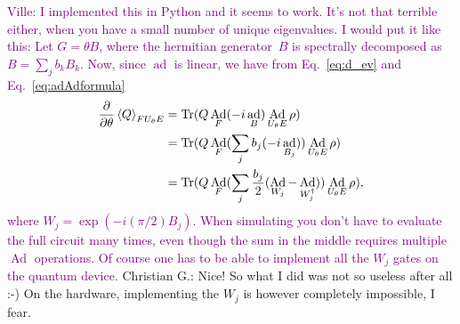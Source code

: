 \documentclass[aps,pra,10pt,twocolumn,groupedaddress,nofootinbib]{revtex4-1}
\theoremstyle{plain}
\DeclareMathOperator{\tr}{Tr}
\DeclareMathOperator{\Ad}{Ad}
\DeclareMathOperator{\ad}{ad}
\newcommand{\pd}[2]{\frac{\partial #1}{\partial #2}}  %
\newcommand{\expect}[1]{\ensuremath{\left\langle #1 \right\rangle}} %
\newcommand{\ville}[1]{\textcolor{purple}{Ville: #1}}
\newcommand{\cg}[1]{\textcolor{cyan!80!black}{Christian G.: #1}}
\begin{document}
\ville{I implemented this in Python and it seems to work. It's not that terrible either, when you have a small number of unique eigenvalues.
I would put it like this:
Let $G = \theta B$, where the hermitian generator~$B$ is spectrally decomposed as~$B = \sum_j b_k B_k$. Now, since $\ad$ is linear, we have
from Eq.~\eqref{eq:d_ev} and Eq.~\eqref{eq:adAdformula}
\begin{align}
  \pd{}{\theta} \expect{Q}_{F U_{\theta} E}
  &= \tr(Q \Ad_F (-i \ad_{B}) \Ad_{U_{\theta} E} \rho)\\
  \notag
  &= \tr(Q \Ad_F (\sum_j b_j (-i \ad_{B_j})) \Ad_{U_{\theta} E} \rho)\\
  \notag
  &= \tr(Q \Ad_F (\sum_j \frac{b_j}{2} (\Ad_{W_j} -\Ad_{W_j^\dagger})) \Ad_{U_{\theta} E} \rho),
\end{align}
where $W_j = \exp(-i (\pi/2) B_j)$.
When simulating you don't have to evaluate the full circuit many times, even though the sum in the middle requires multiple $\Ad$ operations.
Of course one has to be able to implement all the $W_j$ gates on the quantum device.
}
\cg{Nice! So what I did was not so useless after all :-) On the hardware, implementing the $W_j$ is however completely impossible, I fear.}
\end{document}
